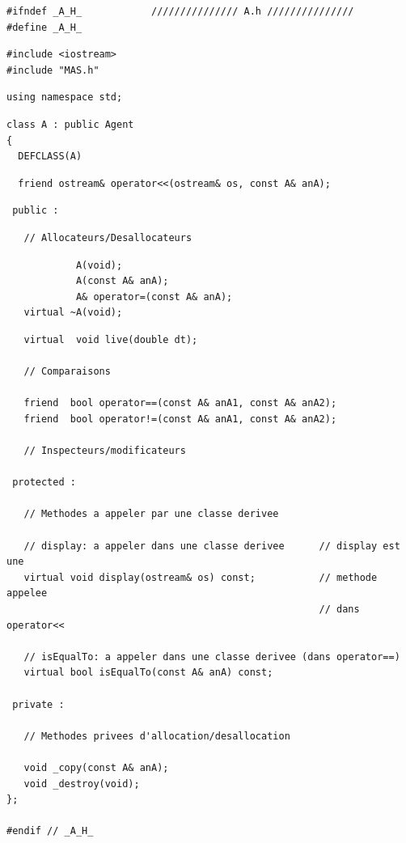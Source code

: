\documentclass[12pt]{article}
\begin{document}
\begin{footnotesize}
\begin{verbatim}
#ifndef _A_H_            /////////////// A.h ///////////////
#define _A_H_
\end{verbatim}
\begin{verbatim}
#include <iostream>
#include "MAS.h"
\end{verbatim}
\begin{verbatim}
using namespace std;
\end{verbatim}
\begin{verbatim}
class A : public Agent
{
  DEFCLASS(A)
\end{verbatim}
\begin{verbatim}
  friend ostream& operator<<(ostream& os, const A& anA);
\end{verbatim}
\begin{verbatim}
 public :
\end{verbatim}
\begin{verbatim}
   // Allocateurs/Desallocateurs
\end{verbatim}
\begin{verbatim}
            A(void);
            A(const A& anA);
            A& operator=(const A& anA);
   virtual ~A(void);
\end{verbatim}
\newpage
\begin{verbatim}
   virtual  void live(double dt);

   // Comparaisons

   friend  bool operator==(const A& anA1, const A& anA2);
   friend  bool operator!=(const A& anA1, const A& anA2);

   // Inspecteurs/modificateurs

 protected :

   // Methodes a appeler par une classe derivee

   // display: a appeler dans une classe derivee      // display est une
   virtual void display(ostream& os) const;           // methode appelee
                                                      // dans operator<<

   // isEqualTo: a appeler dans une classe derivee (dans operator==)
   virtual bool isEqualTo(const A& anA) const;

 private :

   // Methodes privees d'allocation/desallocation

   void _copy(const A& anA);
   void _destroy(void);
};

#endif // _A_H_
\end{verbatim}
\end{footnotesize}
\end{document}
